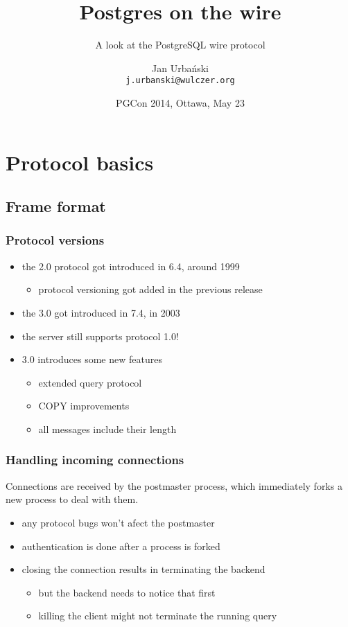 \documentclass{beamer}
\title{Postgres on the wire}
\subtitle{A look at the PostgreSQL wire protocol}
\author[Jan Urbański]{Jan Urbański \\ \texttt{j.urbanski@wulczer.org}}
\institute{Ducksboard}
\date[PGCon 2014]{PGCon 2014, Ottawa, May 23}
\begin{document}
\frame{\titlepage}

\begin{frame}
  \tableofcontents
\end{frame}

\section{Protocol basics}
\subsection{Frame format}

\begin{frame}
  \frametitle{Protocol versions}

  \begin{itemize}
  \item the 2.0 protocol got introduced in 6.4, around 1999
    \begin{itemize}
    \item protocol versioning got added in the previous release
    \end{itemize}
  \item the 3.0 got introduced in 7.4, in 2003
  \item the server still supports protocol 1.0!
  \item 3.0 introduces some new features
    \begin{itemize}
    \item extended query protocol
    \item COPY improvements
    \item all messages include their length
    \end{itemize}
  \end{itemize}
\end{frame}

\begin{frame}
  \frametitle{Handling incoming connections}

  Connections are received by the postmaster process, which immediately forks a
  new process to deal with them.

  \begin{itemize}
  \item any protocol bugs won't afect the postmaster
  \item authentication is done after a process is forked
  \item closing the connection results in terminating the backend
    \begin{itemize}
    \item but the backend needs to notice that first
    \item killing the client might not terminate the running query
    \end{itemize}
  \end{itemize}
\end{frame}
\end{document}
